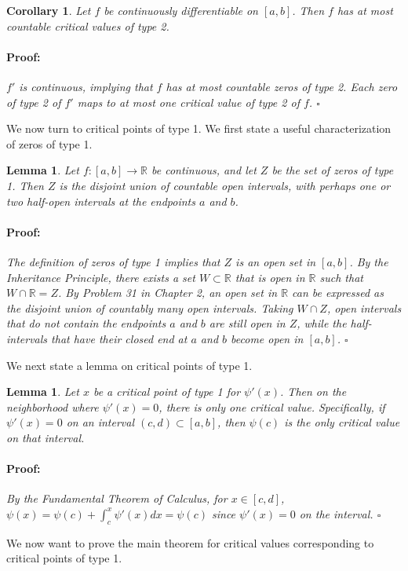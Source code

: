\documentclass{article}
\newenvironment{proof}{\paragraph{Proof:}}{\hfill$\square$}
\newtheorem{lemma}[theorem]{Lemma}
\newtheorem{corollary}[theorem]{Corollary}
\newcommand{\R}{\mathbb{R}}
\begin{document}
\begin{corollary}
Let $f$ be continuously differentiable on $[a, b]$. Then $f$ has at most countable critical values of type 2.
\begin{proof}
$f'$ is continuous, implying that $f$ has at most countable zeros of type 2. Each zero of type 2 of $f'$ maps to at most one critical value of type 2 of $f$.
\end{proof}
\end{corollary}

We now turn to critical points of type 1. We first state a useful characterization of zeros of type 1.

\begin{lemma}
\label{LemmaZerosType1}
Let $f: [a, b] \rightarrow \R$ be continuous, and let $Z$ be the set of zeros of type 1. Then $Z$ is the  disjoint union of countable open intervals, with perhaps one or two half-open intervals at the endpoints $a$ and $b$.
\begin{proof}
The definition of zeros of type 1 implies that $Z$ is an open set in $[a, b]$. By the Inheritance Principle, there exists a set $W \subset \R$ that is open in $\R$ such that $W \cap \R = Z$. By Problem 31 in Chapter 2, an open set in $\R$ can be expressed as the disjoint union of countably many open intervals. Taking $W \cap Z$, open intervals that do not contain the endpoints $a$ and $b$ are still open in $Z$, while the half-intervals that have their closed end at $a$ and $b$ become open in $[a, b]$.
\end{proof}
\end{lemma}

We next state a lemma on critical points of type 1.

\begin{lemma}
\label{LemmaCriticalValuesType1}
Let $x$ be a critical point of type 1 for $\psi'(x)$. Then on the neighborhood where $\psi'(x) = 0$, there is only one critical value. Specifically, if $\psi'(x) = 0$ on an interval $(c, d) \subset [a, b]$, then $\psi(c)$ is the only critical value on that interval.
\begin{proof}
By the Fundamental Theorem of Calculus, for $x \in [c, d]$, $\psi(x) = \psi(c) + \int_c^x \psi'(x) dx = \psi(c)$ since $\psi'(x) = 0$ on the interval. 
\end{proof}
\end{lemma}

We now want to prove the main theorem for critical values corresponding to critical points of type 1.
\end{document}
